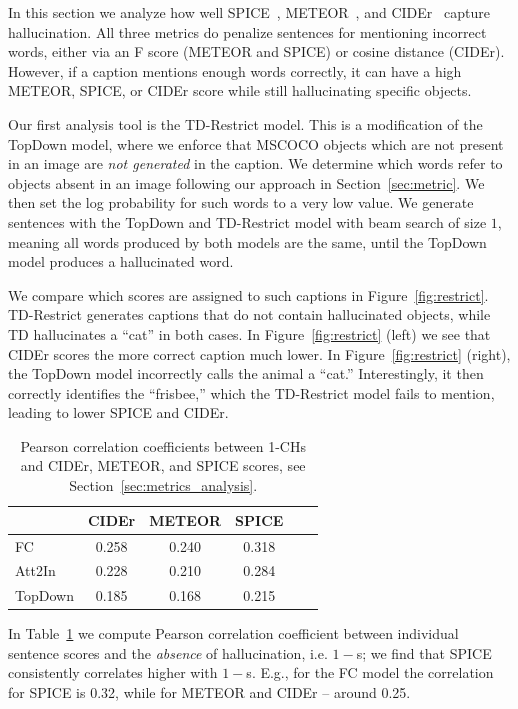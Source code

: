 In this section we analyze how well SPICE~\cite{spice}, METEOR~\cite{meteor}, and CIDEr~\cite{cider} capture hallucination. All three metrics do penalize sentences for mentioning incorrect words, either via an F score (METEOR and SPICE) or cosine distance (CIDEr). However, if a caption mentions enough words correctly, it can have a high METEOR, SPICE, or CIDEr score while still hallucinating specific objects.



Our first analysis tool is the TD-Restrict model. This is a  modification of the TopDown model, where we enforce that MSCOCO objects which are not present in an image are \emph{not generated} in the caption. We determine which words refer to objects absent in an image following our approach in Section~\ref{sec:metric}. We then set the log probability for such words to a very low value. We generate sentences with the TopDown and TD-Restrict model with beam search of size $1$, meaning all words produced by both models are the same, until the TopDown model produces a hallucinated word.

We compare which scores are assigned to such captions in Figure~\ref{fig:restrict}. TD-Restrict generates captions that do not contain hallucinated objects, while TD hallucinates a ``cat'' in both cases. In Figure~\ref{fig:restrict} (left) we see that CIDEr scores the more correct caption much lower. %
In Figure~\ref{fig:restrict} (right), the TopDown model incorrectly calls the animal a ``cat.'' Interestingly, it then correctly identifies the ``frisbee,'' which the TD-Restrict model fails to mention, leading to lower SPICE and CIDEr.

%
\begin{table}[t]
\centering
\small
%
\begin{tabular}{l|c|cccc}
\toprule
        &  CIDEr & METEOR & SPICE    \\
\midrule
FC      & 0.258 & 0.240  & 0.318 \\
Att2In  & 0.228 &  0.210  & 0.284 \\
TopDown & 0.185  & 0.168  & 0.215 \\
\bottomrule
\end{tabular}
\caption{\small Pearson correlation coefficients between 1-CHs and CIDEr, METEOR, and SPICE scores, see Section~\ref{sec:metrics_analysis}.}
\label{tab:metric-correlation}
\end{table}

In Table~\ref{tab:metric-correlation} we compute Pearson correlation coefficient between individual sentence scores and the \emph{absence} of hallucination, i.e. $1-$\metric{}s; %
we find that SPICE consistently correlates higher with $1-$\metric{}s. E.g., for the FC model the correlation for SPICE is 0.32, while for METEOR and CIDEr -- around 0.25.%



